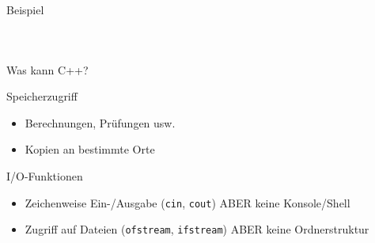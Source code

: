 \lstset{tabsize=2}
\begin{frame}[t]{Beispiel}
	\vspace{-2em}
	\begin{columns}[t]
			\onslide*<+-> {  }
			
		\column{0.53\textwidth}
			\onslide*<+> {  }
			\onslide*<+> {  }
			\onslide*<+> {  }
			\onslide*<+> {  }
			\onslide*<+> {  }
	\end{columns}
\end{frame}

\begin{frame}[fragile]{Was kann C++?}
	\begin{block}{Speicherzugriff}
		\begin{itemize}
			\item Berechnungen, Prüfungen usw.
			\item Kopien an bestimmte Orte
		\end{itemize}
	\end{block}
	
	\pause
	\vspace{2em}
	
	\begin{block}{I/O-Funktionen}
		\begin{itemize}
			\item Zeichenweise Ein-/Ausgabe (\verb|cin|, \verb|cout|) ABER keine Konsole/Shell
			\item Zugriff auf Dateien (\verb|ofstream|, \verb|ifstream|) ABER keine Ordnerstruktur
		\end{itemize}
	\end{block}
\end{frame}

